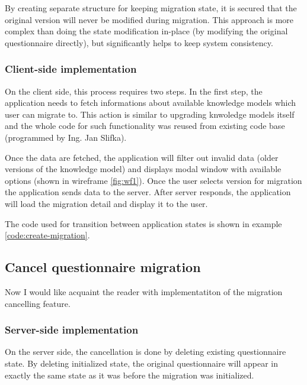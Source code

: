 By creating separate structure for keeping migration state, it is secured that the original version will never be modified during migration.
This approach is more complex than doing the state modification in-place (by modifying the original questionnaire directly), but significantly helps to keep system consistency.

\subsubsection*{Client-side implementation}

On the client side, this process requires two steps.
In the first step, the application needs to fetch informations about available knowledge models which user can migrate to.
This action is similar to upgrading knwoledge models itself and the whole code for such functionality was reused from existing code base (programmed by Ing. Jan Slifka\cite{mt-slifka}).

Once the data are fetched, the application will filter out invalid data (older versions of the knowledge model) and displays modal window with available options (shown in wireframe \ref{fig:wf1}).
Once the user selects version for migration the application sends data to the server.
After server responds, the application will load the migration detail and display it to the user.

The code used for transition between application states is shown in example \ref{code:create-migration}.


\subsection{Cancel questionnaire migration}

Now I would like acquaint the reader with implementatiton of the migration cancelling feature.

\subsubsection*{Server-side implementation}

On the server side, the cancellation is done by deleting existing questionnaire state.
By deleting initialized state, the original questionnaire will appear in exactly the same state as it was before the migration was initialized.

